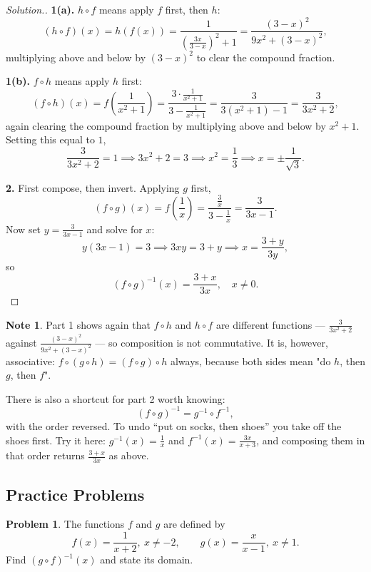 \documentclass[11pt,a4paper]{article}
\theoremstyle{definition}
\newtheorem{note}[thm]{Note}
\newtheorem{problemx}{Problem}[section]
\newenvironment{problem}{\begin{problemx}}{\end{problemx}}
\newenvironment{solution}
  {\renewcommand{\qedsymbol}{}\begin{proof}[\textit{Solution}.]}
  {\end{proof}}
\begin{document}
\begin{solution}
\textbf{1(a).} $h\circ f$ means apply $f$ first, then $h$:
$$(h\circ f)(x)=h\left(f(x)\right)=\frac{1}{\left(\frac{3x}{3-x}\right)^{2}+1}
=\frac{(3-x)^{2}}{9x^{2}+(3-x)^{2}} ,$$
multiplying above and below by $(3-x)^{2}$ to clear the compound fraction.

\textbf{1(b).} $f\circ h$ means apply $h$ first:
$$(f\circ h)(x)=f\left(\frac{1}{x^{2}+1}\right)
=\frac{3\cdot\frac{1}{x^{2}+1}}{3-\frac{1}{x^{2}+1}}
=\frac{3}{3\left(x^{2}+1\right)-1}=\frac{3}{3x^{2}+2},$$
again clearing the compound fraction by multiplying above and below by $x^{2}+1$.
Setting this equal to $1$,
$$\frac{3}{3x^{2}+2}=1 \implies 3x^{2}+2=3 \implies x^{2}=\frac{1}{3}
\implies x=\pm\frac{1}{\sqrt{3}} .$$

\textbf{2.} First compose, then invert. Applying $g$ first,
$$(f\circ g)(x)=f\left(\frac{1}{x}\right)
=\frac{\frac{3}{x}}{3-\frac{1}{x}}=\frac{3}{3x-1} .$$
Now set $y=\frac{3}{3x-1}$ and solve for $x$:
$$y(3x-1)=3 \implies 3xy=3+y \implies x=\frac{3+y}{3y},$$
so
$$(f\circ g)^{-1}(x)=\frac{3+x}{3x},\quad x\neq 0 .$$
\end{solution}

\begin{note}
Part 1 shows again that $f\circ h$ and $h\circ f$ are different functions ---
$\frac{3}{3x^{2}+2}$ against $\frac{(3-x)^{2}}{9x^{2}+(3-x)^{2}}$ --- so composition
is not commutative. It is, however, associative:
$f\circ(g\circ h)=(f\circ g)\circ h$ always, because both sides mean "do $h$, then
$g$, then $f$".

There is also a shortcut for part 2 worth knowing:
$$(f\circ g)^{-1}=g^{-1}\circ f^{-1},$$
with the order reversed. To undo ``put on socks, then shoes'' you take off the shoes
first. Try it here: $g^{-1}(x)=\frac{1}{x}$ and $f^{-1}(x)=\frac{3x}{x+3}$, and
composing them in that order returns $\frac{3+x}{3x}$ as above.
\end{note}
\pagebreak
\subsection{Practice Problems}

\begin{problem}
The functions $f$ and $g$ are defined by
$$f(x)=\frac{1}{x+2},\ x\neq -2,\qquad g(x)=\frac{x}{x-1},\ x\neq 1 .$$
Find $\left(g\circ f\right)^{-1}(x)$ and state its domain.
\end{problem}
\end{document}
